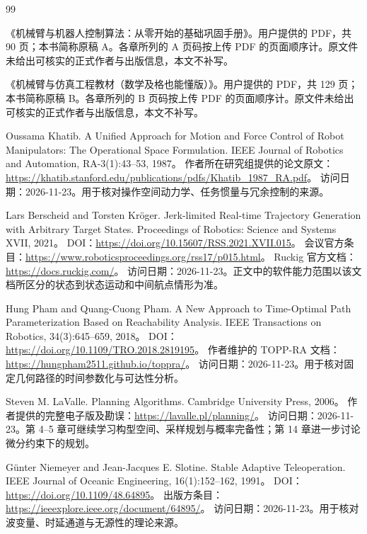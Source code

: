 \begingroup
\renewcommand{\bibname}{参考资料与进一步阅读}
\begin{thebibliography}{99}
\small
\setlength{\itemsep}{9pt}
\setlength{\parskip}{2pt}
\raggedright
{}

《机械臂与机器人控制算法：从零开始的基础巩固手册》。用户提供的 PDF，共 90 页；本书简称原稿 A。各章所列的 A 页码按上传 PDF 的页面顺序计。原文件未给出可核实的正式作者与出版信息，本文不补写。

《机械臂与仿真工程教材（数学及格也能懂版）》。用户提供的 PDF，共 129 页；本书简称原稿 B。各章所列的 B 页码按上传 PDF 的页面顺序计。原文件未给出可核实的正式作者与出版信息，本文不补写。

Oussama Khatib.
A Unified Approach for Motion and Force Control of Robot Manipulators: The Operational Space Formulation.
IEEE Journal of Robotics and Automation, RA-3(1):43--53, 1987。
作者所在研究组提供的论文原文：
\url{https://khatib.stanford.edu/publications/pdfs/Khatib_1987_RA.pdf}。
访问日期：2026-11-23。用于核对操作空间动力学、任务惯量与冗余控制的来源。

Lars Berscheid and Torsten Kröger.
Jerk-limited Real-time Trajectory Generation with Arbitrary Target States.
Proceedings of Robotics: Science and Systems XVII, 2021。
DOI：\url{https://doi.org/10.15607/RSS.2021.XVII.015}。
会议官方条目：\url{https://www.roboticsproceedings.org/rss17/p015.html}。
Ruckig 官方文档：\url{https://docs.ruckig.com/}。
访问日期：2026-11-23。正文中的软件能力范围以该文档所区分的状态到状态运动和中间航点情形为准。

Hung Pham and Quang-Cuong Pham.
A New Approach to Time-Optimal Path Parameterization Based on Reachability Analysis.
IEEE Transactions on Robotics, 34(3):645--659, 2018。
DOI：\url{https://doi.org/10.1109/TRO.2018.2819195}。
作者维护的 TOPP-RA 文档：\url{https://hungpham2511.github.io/toppra/}。
访问日期：2026-11-23。用于核对固定几何路径的时间参数化与可达性分析。

Steven M. LaValle.
Planning Algorithms.
Cambridge University Press, 2006。
作者提供的完整电子版及勘误：\url{https://lavalle.pl/planning/}。
访问日期：2026-11-23。第 4--5 章可继续学习构型空间、采样规划与概率完备性；第 14 章进一步讨论微分约束下的规划。

Günter Niemeyer and Jean-Jacques E. Slotine.
Stable Adaptive Teleoperation.
IEEE Journal of Oceanic Engineering, 16(1):152--162, 1991。
DOI：\url{https://doi.org/10.1109/48.64895}。
出版方条目：\url{https://ieeexplore.ieee.org/document/64895/}。
访问日期：2026-11-23。用于核对波变量、时延通道与无源性的理论来源。


\end{thebibliography}
